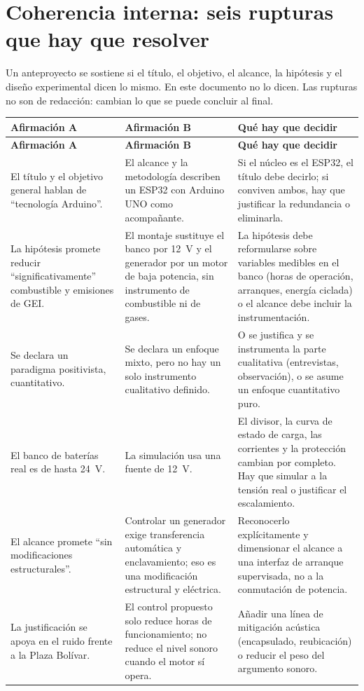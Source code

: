 \documentclass[11pt,a4paper]{article}
\begin{document}
\section{Coherencia interna: seis rupturas que hay que resolver}

Un anteproyecto se sostiene si el título, el objetivo, el alcance, la hipótesis y el diseño experimental dicen lo mismo. En este documento no lo dicen. Las rupturas no son de redacción: cambian lo que se puede concluir al final.

\begingroup\small
\begin{longtable}{@{}>{\raggedright\arraybackslash}p{3.9cm} >{\raggedright\arraybackslash}p{5.4cm} >{\raggedright\arraybackslash}p{5.8cm}@{}}
\toprule
\textbf{Afirmación A} & \textbf{Afirmación B} & \textbf{Qué hay que decidir} \\
\midrule
\endfirsthead
\toprule
\textbf{Afirmación A} & \textbf{Afirmación B} & \textbf{Qué hay que decidir} \\
\midrule
\endhead
El título y el objetivo general hablan de ``tecnología Arduino''. & El alcance y la metodología describen un ESP32 con Arduino UNO como acompañante. & Si el núcleo es el ESP32, el título debe decirlo; si conviven ambos, hay que justificar la redundancia o eliminarla. \\
La hipótesis promete reducir ``significativamente'' combustible y emisiones de GEI. & El montaje sustituye el banco por 12~V y el generador por un motor de baja potencia, sin instrumento de combustible ni de gases. & La hipótesis debe reformularse sobre variables medibles en el banco (horas de operación, arranques, energía ciclada) o el alcance debe incluir la instrumentación. \\
Se declara un paradigma positivista, cuantitativo. & Se declara un enfoque mixto, pero no hay un solo instrumento cualitativo definido. & O se justifica y se instrumenta la parte cualitativa (entrevistas, observación), o se asume un enfoque cuantitativo puro. \\
El banco de baterías real es de hasta 24~V. & La simulación usa una fuente de 12~V. & El divisor, la curva de estado de carga, las corrientes y la protección cambian por completo. Hay que simular a la tensión real o justificar el escalamiento. \\
El alcance promete ``sin modificaciones estructurales''. & Controlar un generador exige transferencia automática y enclavamiento; eso es una modificación estructural y eléctrica. & Reconocerlo explícitamente y dimensionar el alcance a una interfaz de arranque supervisada, no a la conmutación de potencia. \\
La justificación se apoya en el ruido frente a la Plaza Bolívar. & El control propuesto solo reduce horas de funcionamiento; no reduce el nivel sonoro cuando el motor sí opera. & Añadir una línea de mitigación acústica (encapsulado, reubicación) o reducir el peso del argumento sonoro. \\
\bottomrule
\end{longtable}
\endgroup
\end{document}
